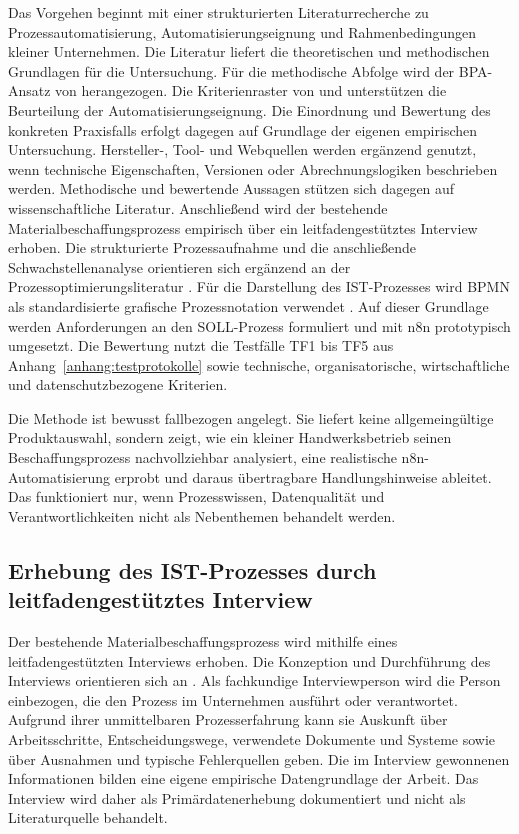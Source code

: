 \documentclass[a4paper,12pt]{article}
\begin{document}
Das Vorgehen beginnt mit einer strukturierten Literaturrecherche zu Prozessautomatisierung, Automatisierungseignung und Rahmenbedingungen kleiner Unternehmen. Die Literatur liefert die theoretischen und methodischen Grundlagen für die Untersuchung. Für die methodische Abfolge wird der BPA-Ansatz von \textcite{moreira_methodology_2025} herangezogen. Die Kriterienraster von \textcite{wellmann_framework_2020} und \textcite{choi_candidate_2021} unterstützen die Beurteilung der Automatisierungseignung. Die Einordnung und Bewertung des konkreten Praxisfalls erfolgt dagegen auf Grundlage der eigenen empirischen Untersuchung. Hersteller-, Tool- und Webquellen werden ergänzend genutzt, wenn technische Eigenschaften, Versionen oder Abrechnungslogiken beschrieben werden. Methodische und bewertende Aussagen stützen sich dagegen auf wissenschaftliche Literatur. Anschließend wird der bestehende Materialbeschaffungsprozess empirisch über ein leitfadengestütztes Interview erhoben. Die strukturierte Prozessaufnahme und die anschließende Schwachstellenanalyse orientieren sich ergänzend an der Prozessoptimierungsliteratur \parencite{kompetenzzentrum_augsburg_prozessoptimierung_2020}. Für die Darstellung des IST-Prozesses wird BPMN als standardisierte grafische Prozessnotation verwendet \parencite{object_management_group_bpmn_2014}. Auf dieser Grundlage werden Anforderungen an den SOLL-Prozess formuliert und mit n8n prototypisch umgesetzt. Die Bewertung nutzt die Testfälle TF1 bis TF5 aus Anhang~\ref{anhang:testprotokolle} sowie technische, organisatorische, wirtschaftliche und datenschutzbezogene Kriterien.

Die Methode ist bewusst fallbezogen angelegt. Sie liefert keine allgemeingültige Produktauswahl, sondern zeigt, wie ein kleiner Handwerksbetrieb seinen Beschaffungsprozess nachvollziehbar analysiert, eine realistische n8n-Automatisierung erprobt und daraus übertragbare Handlungshinweise ableitet. Das funktioniert nur, wenn Prozesswissen, Datenqualität und Verantwortlichkeiten nicht als Nebenthemen behandelt werden.

\subsection{Erhebung des IST-Prozesses durch leitfadengestütztes Interview}
Der bestehende Materialbeschaffungsprozess wird mithilfe eines leitfadengestützten Interviews erhoben. Die Konzeption und Durchführung des Interviews orientieren sich an \textcite{helfferich_leitfaden_2022}. Als fachkundige Interviewperson wird die Person einbezogen, die den Prozess im Unternehmen ausführt oder verantwortet. Aufgrund ihrer unmittelbaren Prozesserfahrung kann sie Auskunft über Arbeitsschritte, Entscheidungswege, verwendete Dokumente und Systeme sowie über Ausnahmen und typische Fehlerquellen geben. Die im Interview gewonnenen Informationen bilden eine eigene empirische Datengrundlage der Arbeit. Das Interview wird daher als Primärdatenerhebung dokumentiert und nicht als Literaturquelle behandelt.
\end{document}
